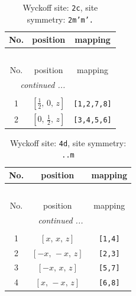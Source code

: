 \documentclass[fleqn,8pt]{jsarticle}
\begin{document}
\begin{longtable}{ccc}
\caption{Wyckoff site: {\tt 2c}, site symmetry: {\tt 2m'm'.}}
 \\
 \hline \hline
No. & position & mapping \\ \hline \endfirsthead

\multicolumn{2}{l}{\tablename\ \thetable{}} \\
 \hline \hline
No. & position & mapping \\ \hline \endhead

 \hline \hline
\multicolumn{2}{r}{\footnotesize\it continued ...} \\ \endfoot

 \hline \hline
\multicolumn{2}{r}{} \\ \endlastfoot

1 & $\left[ \frac{1}{2},\, 0,\, z \right]$ & {\tt [1,2,7,8]} \\ \hline
2 & $\left[ 0,\, \frac{1}{2},\, z \right]$ & {\tt [3,4,5,6]} \\
\end{longtable}
\renewcommand{\arraystretch}{1.2}
\begin{longtable}{ccc}
\caption{Wyckoff site: {\tt 4d}, site symmetry: {\tt ..m}}
 \\
 \hline \hline
No. & position & mapping \\ \hline \endfirsthead

\multicolumn{2}{l}{\tablename\ \thetable{}} \\
 \hline \hline
No. & position & mapping \\ \hline \endhead

 \hline \hline
\multicolumn{2}{r}{\footnotesize\it continued ...} \\ \endfoot

 \hline \hline
\multicolumn{2}{r}{} \\ \endlastfoot

1 & $\left[ x,\, x,\, z \right]$ & {\tt [1,4]} \\ \hline
2 & $\left[ - x,\, - x,\, z \right]$ & {\tt [2,3]} \\ \hline
3 & $\left[ - x,\, x,\, z \right]$ & {\tt [5,7]} \\ \hline
4 & $\left[ x,\, - x,\, z \right]$ & {\tt [6,8]} \\
\end{longtable}
\renewcommand{\arraystretch}{1.2}
\end{document}
